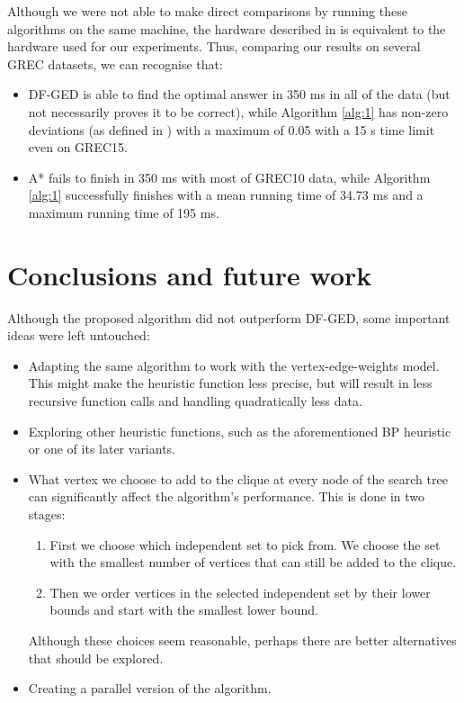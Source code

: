 \documentclass{article}
\theoremstyle{definition}
\begin{document}
Although we were not able to make direct comparisons by running these algorithms on the same machine, the hardware described in \cite{DBLP:conf/icpram/Abu-AishehRRM15} is equivalent to the hardware used for our experiments. Thus, comparing our results on several GREC datasets, we can recognise that:
\begin{itemize}
\item DF-GED is able to find the optimal answer in 350 ms in all of the data (but not necessarily proves it to be correct), while Algorithm \ref{alg:1} has non-zero deviations (as defined in \cite{DBLP:conf/icpram/Abu-AishehRRM15}) with a maximum of 0.05 with a 15 s time limit even on GREC15.
\item A* fails to finish in 350 ms with most of GREC10 data, while Algorithm \ref{alg:1} successfully finishes with a mean running time of 34.73 ms and a maximum running time of 195 ms.
\end{itemize}
\section{Conclusions and future work}
Although the proposed algorithm did not outperform DF-GED, some important ideas were left untouched:
\begin{itemize}
\item Adapting the same algorithm to work with the vertex-edge-weights model. This might make the heuristic function less precise, but will result in less recursive function calls and handling quadratically less data.
\item Exploring other heuristic functions, such as the aforementioned BP heuristic or one of its later variants.
\item What vertex we choose to add to the clique at every node of the search tree can significantly affect the algorithm's performance. This is done in two stages:
  \begin{enumerate}
  \item First we choose which independent set to pick from. We choose the set with the smallest number of vertices that can still be added to the clique.
  \item Then we order vertices in the selected independent set by their lower bounds and start with the smallest lower bound.
  \end{enumerate}
  Although these choices seem reasonable, perhaps there are better alternatives that should be explored.
\item Creating a parallel version of the algorithm.
\end{itemize}
\printbibliography
\end{document}
